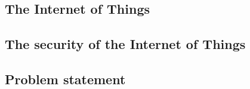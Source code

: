 \subsection[IoT]{The Internet of Things}

\subsection[IoT Security]{The security of the Internet of Things}

\subsection{Problem statement}